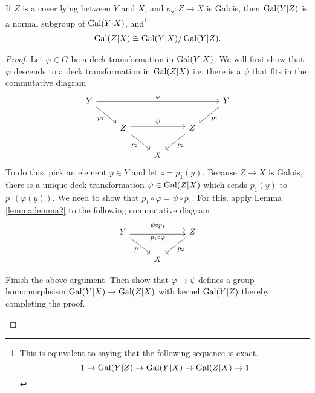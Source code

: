 \begin{proposition}
  If $Z$ is a cover lying between $Y$ and $X$, and $p_2:Z \rightarrow X$ is Galois, then $\operatorname{Gal}(Y|Z)$ is a normal subgroup of $\operatorname{Gal}(Y|X)$, and\footnote{This is equivalent to saying that the following sequence is exact. \begin{equation*}
    1 \rightarrow \operatorname{Gal}(Y|Z) \rightarrow \operatorname{Gal}(Y|X) \rightarrow \operatorname{Gal}(Z|X) \rightarrow 1
  \end{equation*}}
    \begin{align*}
      \operatorname{Gal}(Z|X) \cong \operatorname{Gal}(Y|X) / \operatorname{Gal}(Y|Z).
    \end{align*}
\end{proposition}
\begin{proof}
  Let $\varphi \in G$ be a deck transformation in $\operatorname{Gal}(Y|X)$. We will first show that $\varphi$ descends to a deck transformation in $\operatorname{Gal}(Z|X)$ i.e. there is a $\psi$ that fits in the commutative diagram
  \begin{equation*}
    \begin{tikzcd}
      Y \ar[rrrr, "\varphi"] \ar[rd, "p_1"']
      & & & &
      Y  \ar[ld, "p_1"]\\
      & Z \ar[rr, shift left, "\psi"] \ar[rd,"p_2"']
      & & Z \ar[ld,"p_2"] \\
      & &  X
    \end{tikzcd}
  \end{equation*}
  To do this, pick an element $y \in Y$ and let $ z = p_1(y)$.
  Because $Z \rightarrow X$ is Galois, there is a unique deck transformation $\psi \in \operatorname{Gal}(Z|X)$ which sends $p_1(y)$ to $p_1(\varphi(y))$.
  We need to show that $p_1 \circ \varphi = \psi \circ p_1$.
  For this, apply Lemma \ref{lemma:lemma2} to the following commutative diagram
  \begin{equation*}
    \begin{tikzcd}
      Y \ar[rr, shift left, "\psi \circ p_1"] \ar[rr, shift right, "p_1 \circ \varphi"']  \ar[rd, "p"']
      & & Z \ar[ld,"p_2"] \\
      & X
    \end{tikzcd}
  \end{equation*}
  \begin{qbox}
    Finish the above argument. Then show that $\varphi \mapsto \psi$ defines a group homomorphsism $\operatorname{Gal}(Y|X) \rightarrow \operatorname{Gal}(Z|X)$ with kernel $\operatorname{Gal}(Y|Z)$ thereby completing the proof.
  \end{qbox}
\end{proof}





